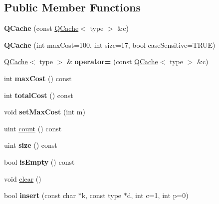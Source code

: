 \subsection*{Public Member Functions}
\begin{DoxyCompactItemize}
\item 
\mbox{\label{class_q_cache_ab3a5d53c5d88b1cddd682a6ea2fedf2b}} 
{\bfseries Q\+Cache} (const \mbox{\hyperlink{class_q_cache}{Q\+Cache}}$<$ type $>$ \&c)
\item 
\mbox{\label{class_q_cache_a8a7ceeb5474b33dd556cef1285f29aa0}} 
{\bfseries Q\+Cache} (int max\+Cost=100, int size=17, bool case\+Sensitive=T\+R\+UE)
\item 
\mbox{\label{class_q_cache_ad56788e456b255a08879298d9aeb1cc9}} 
\mbox{\hyperlink{class_q_cache}{Q\+Cache}}$<$ type $>$ \& {\bfseries operator=} (const \mbox{\hyperlink{class_q_cache}{Q\+Cache}}$<$ type $>$ \&c)
\item 
\mbox{\label{class_q_cache_aee4f439357ece4d56edfe0ab239c0916}} 
int {\bfseries max\+Cost} () const
\item 
\mbox{\label{class_q_cache_a86162425c85ff459b3666debd321aafb}} 
int {\bfseries total\+Cost} () const
\item 
\mbox{\label{class_q_cache_afd3387a0f863004c27006015b1e9d71d}} 
void {\bfseries set\+Max\+Cost} (int m)
\item 
uint \mbox{\hyperlink{class_q_cache_ac2f569c43cd3aeaabf28aef74a1e33b4}{count}} () const
\item 
\mbox{\label{class_q_cache_a8114e2cd6d136ef827812835a0569e64}} 
uint {\bfseries size} () const
\item 
\mbox{\label{class_q_cache_a9c09792d0034e16d875b8597dc7cdd92}} 
bool {\bfseries is\+Empty} () const
\item 
void \mbox{\hyperlink{class_q_cache_a23066e089d1e7de0fc1f5ba85bd05719}{clear}} ()
\item 
\mbox{\label{class_q_cache_a1ac449cbe4630f5c731ecfaf0662db59}} 
bool {\bfseries insert} (const char $\ast$k, const type $\ast$d, int c=1, int p=0)

\end{DoxyCompactItemize}
